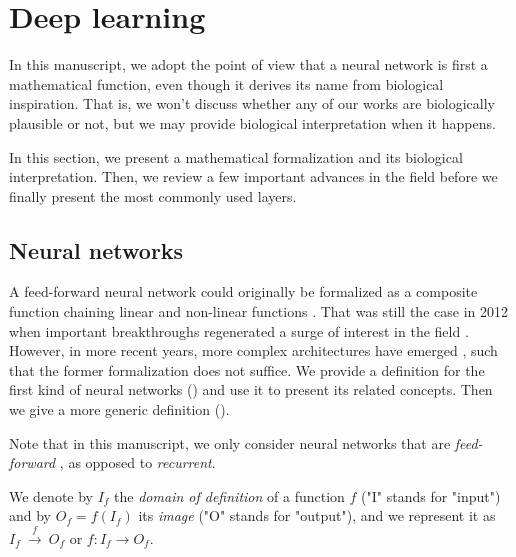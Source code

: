 \section{Deep learning}
\label{sec:nn}

In this manuscript, we adopt the point of view that a neural network is first a mathematical function, even though it derives its name from biological inspiration. That is, we won't discuss whether any of our works are biologically plausible or not, but we may provide biological interpretation when it happens.

In this section, we present a mathematical formalization and its biological interpretation. Then, we review a few important advances in the field before we finally present the most commonly used layers.

\subsection{Neural networks}
\label{sec:form}

A feed-forward neural network could originally be formalized as a composite function chaining linear and non-linear functions \citep{rumelhart1985learning,lecun1989backpropagation,lecun1995convolutional}. That was still the case in 2012 when important breakthroughs regenerated a surge of interest in the field \citep{hinton2012deep,krizhevsky2012imagenet,simonyan2014very}. However, in more recent years, more complex architectures have emerged \citep{szegedy2015going,he2016deep,zoph2016neural,huang2017densely}, such that the former formalization does not suffice. We provide a definition for the first kind of neural networks () and use it to present its related concepts. Then we give a more generic definition ().

Note that in this manuscript, we only consider neural networks that are \emph{feed-forward} \citep{zell1994simulation, wiki:fnn}, as opposed to \emph{recurrent}.

We denote by $I_f$ the \textit{domain of definition} of a function $f$ ("I" stands for "input") and by $O_f = f(I_f)$ its \textit{image} ("O" stands for "output"), and we represent it as $I_f~\xrightarrow{f}~O_f$ or $f: I_f \to O_f$.


